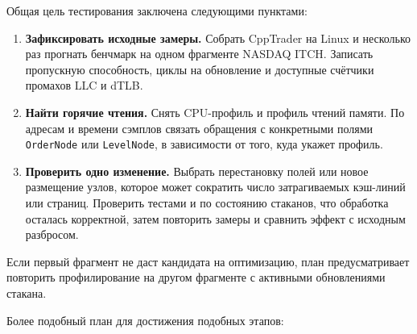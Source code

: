 \documentclass[a4paper,12pt]{article}
\begin{document}
Общая цель тестирования заключена следующими пунктами:
\begin{enumerate}
    \item \textbf{Зафиксировать исходные замеры.}
    Собрать CppTrader на Linux и несколько раз прогнать бенчмарк на одном
    фрагменте NASDAQ ITCH. Записать пропускную способность, циклы на
    обновление и доступные счётчики промахов LLC и dTLB.

    \item \textbf{Найти горячие чтения.}
    Снять CPU-профиль и профиль чтений памяти. По адресам и времени сэмплов
    связать обращения с конкретными полями \texttt{OrderNode} или
    \texttt{LevelNode}, в зависимости от того, куда укажет профиль.

    \item \textbf{Проверить одно изменение.}
    Выбрать перестановку полей или новое размещение узлов, которое может
    сократить число затрагиваемых кэш-линий или страниц. Проверить тестами
    и по состоянию стаканов, что обработка осталась корректной, затем
    повторить замеры и сравнить эффект с исходным разбросом.
\end{enumerate}

Если первый фрагмент не даст кандидата на оптимизацию, план предусматривает
повторить профилирование на другом фрагменте с активными обновлениями стакана.

Более подобный план для достижения подобных этапов:
\end{document}
